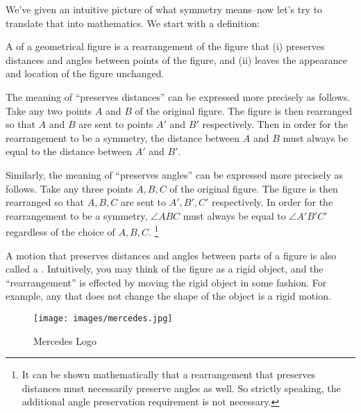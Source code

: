We've given an intuitive picture of what symmetry means--now let's try to translate that into mathematics. We start with a definition:

\begin{defn} A  of a geometrical figure is a rearrangement of the figure that (i) preserves distances and angles between points of the figure,
 and (ii) leaves the appearance and location of the figure unchanged.
\end{defn}

\begin{rem}
The meaning  of ``preserves distances'' can be expressed more precisely as follows. Take any two points $A$ and $B$ of the original figure. The figure is then rearranged so that $A$ and $B$ are sent to points $A'$ and $B'$ respectively. Then in order for the rearrangement to be  a symmetry, the distance between $A$ and $B$ must always be equal to the distance between $A'$ and $B'$.

Similarly, the meaning of  ``preserves angles'' can be expressed more precisely as follows. Take any three points $A, B, C$ of the original figure. The figure is then rearranged so that $A, B, C$ are sent to $A', B', C'$ respectively. In order for the rearrangement to be  a symmetry, $\angle ABC$ must always be equal to $\angle A'B'C'$ regardless of the choice of $A, B, C$.
\footnote{It can be shown mathematically that a rearrangement that preserves distances must necessarily preserve angles as well. So strictly speaking, the additional  angle preservation  requirement is not necessary.}
\end{rem}

A motion that preserves distances and angles between parts of a figure is also called a . Intuitively, you may think of the figure as a rigid object, and the ``rearrangement'' is effected by moving the rigid object in some fashion.  For example, any   that does not change the shape of the object is a rigid motion.

\begin{figure}[ht]
\begin{center}
\texttt{[image: images/mercedes.jpg]}
\caption{Mercedes Logo}\label{mercedes}
\end{center}
\end{figure}

